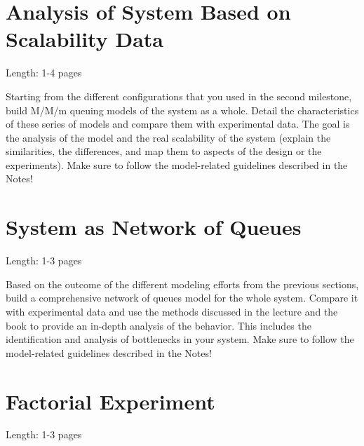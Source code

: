 \documentclass[11pt]{article}
\begin{document}

\pagebreak

\section{Analysis of System Based on Scalability Data}\label{sec:analysis-scalability}

Length: 1-4 pages

Starting from the different configurations that you used in the second milestone, build M/M/m queuing models of the system as a whole. Detail the characteristics of these series of models and compare them with experimental data. The goal is the analysis of the model and the real scalability of the system (explain the similarities, the differences, and map them to aspects of the design or the experiments). Make sure to follow the model-related guidelines described in the Notes!

\section{System as Network of Queues}\label{sec:network-of-queues}

Length: 1-3 pages

Based on the outcome of the different modeling efforts from the previous sections, build a comprehensive network of queues model for the whole system. Compare it with experimental data and use the methods discussed in the lecture and the book to provide an in-depth analysis of the behavior. This includes the identification and analysis of bottlenecks in your system. Make sure to follow the model-related guidelines described in the Notes!

\section{Factorial Experiment}\label{sec:2k-experiment}

Length: 1-3 pages
\end{document}
